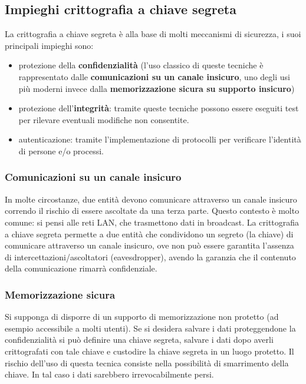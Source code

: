 \subsection{Impieghi crittografia a chiave segreta}
La crittografia a chiave segreta è alla base di molti meccanismi di sicurezza, i suoi principali impieghi sono: 
\begin{itemize}
  \item protezione della \textbf{confidenzialità} (l'uso classico di queste tecniche è rappresentato dalle \textbf{comunicazioni su un canale insicuro}, uno degli usi più moderni invece dalla \textbf{memorizzazione sicura su supporto insicuro})
  \item protezione dell'\textbf{integrità}: tramite queste tecniche possono essere eseguiti test per rilevare eventuali modifiche non consentite.
  \item autenticazione: tramite l'implementazione di protocolli per verificare l'identità di persone e/o processi.
\end{itemize}

\subsubsection{Comunicazioni su un canale insicuro}
In molte circostanze, due entità devono comunicare attraverso un canale insicuro correndo il rischio di essere ascoltate da una terza parte. Questo contesto è molto comune: si pensi alle reti LAN, che trasmettono dati in broadcast. La crittografia a chiave segreta permette a due entità che condividono un segreto (la chiave) di comunicare attraverso un canale insicuro, ove non può essere garantita l’assenza di intercettazioni/ascoltatori (eavesdropper), avendo la garanzia che il contenuto della comunicazione rimarrà confidenziale.

\subsubsection{Memorizzazione sicura}
Si supponga di disporre di un supporto di memorizzazione non protetto (ad esempio accessibile a molti utenti). Se si desidera salvare i dati proteggendone la confidenzialità si può definire una chiave segreta, salvare i dati dopo averli crittografati con tale chiave e custodire la chiave segreta in un luogo protetto. Il rischio dell'uso di questa tecnica consiste nella possibilità di smarrimento della chiave. In tal caso i dati sarebbero irrevocabilmente persi.

